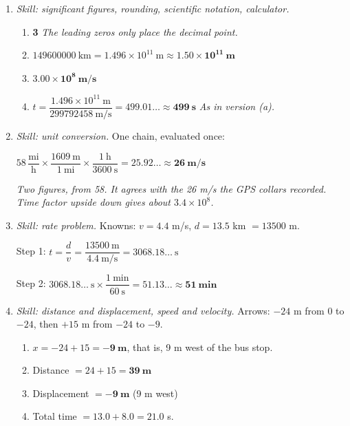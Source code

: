 \documentclass[12pt, twoside]{article}
\begin{document}
\begin{enumerate}[itemsep=0.5cm]

\item \emph{Skill: significant figures, rounding, scientific notation, calculator.}
  \begin{enumerate}[itemsep=0.3cm]
    \item \textbf{3} \quad \emph{The leading zeros only place the decimal point.}
    \item $\num{149600000}~\text{km} = 1.496 \times 10^{11}~\text{m} \approx
      \mathbf{1.50 \times 10^{11}~\textbf{m}}$
    \item $\mathbf{3.00 \times 10^{8}~\textbf{m/s}}$
    \item $t = \dfrac{1.496 \times 10^{11}~\text{m}}{\num{299792458}~\text{m/s}} =
      499.01\ldots \approx \mathbf{499~\textbf{s}}$ \quad \emph{As in version (a).}
  \end{enumerate}

\item \emph{Skill: unit conversion.} One chain, evaluated once:

  $58\,\dfrac{\text{mi}}{\text{h}} \times \dfrac{1609~\text{m}}{1~\text{mi}} \times
  \dfrac{1~\text{h}}{3600~\text{s}} = 25.92\ldots \approx
  \mathbf{26~\textbf{m/s}}$

  \emph{Two figures, from 58. It agrees with the 26 m/s the GPS collars recorded.
  Time factor upside down gives about $3.4 \times 10^{8}$.}

\item \emph{Skill: rate problem.} Knowns: $v = 4.4$ m/s, $d = 13.5$ km
  $= \num{13500}$ m.

  Step 1: \quad $t = \dfrac{d}{v} = \dfrac{\num{13500}~\text{m}}{4.4~\text{m/s}} =
  3068.18\ldots~\text{s}$

  Step 2: \quad $3068.18\ldots~\text{s} \times \dfrac{1~\text{min}}{60~\text{s}} =
  51.13\ldots \approx \mathbf{51~\textbf{min}}$

\item \emph{Skill: distance and displacement, speed and velocity.} Arrows: $-24$ m
  from 0 to $-24$, then $+15$ m from $-24$ to $-9$.
  \begin{enumerate}[itemsep=0.3cm]
    \item $x = -24 + 15 = \mathbf{-9~\textbf{m}}$, that is, 9 m west of the bus
      stop.
    \item Distance $= 24 + 15 = \mathbf{39~\textbf{m}}$
    \item Displacement $= \mathbf{-9~\textbf{m}}$ (9 m west)
    \item Total time $= 13.0 + 8.0 = 21.0$ s.


\end{enumerate}
\end{enumerate}
\end{document}
